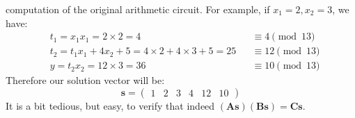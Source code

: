 \begin{example}
	computation of the original arithmetic circuit.
	For example, if \(x_1 = 2, x_2 = 3\), we have:
	\begin{align*}
		 & t_1 = x_1x_1 = 2 \times 2 = 4                              &  & \equiv  4  \pmod{13} \\
		 & t_2 = t_1x_1 + 4x_2 + 5 = 4 \times 2 + 4 \times 3 + 5 = 25 &  & \equiv 12 \pmod{13}  \\
		 & y = t_2x_2 = 12 \times 3 = 36                              &  & \equiv 10 \pmod{13}
	\end{align*}
	Therefore our solution vector will be:
	\[\bm{s} = \begin{pmatrix}1 & 2 & 3 & 4 & 12 & 10\end{pmatrix} \]
	It is a bit tedious, but easy, to verify that indeed
	\((\bm{A}\bm{s})(\bm{B}\bm{s}) = \bm{C}\bm{s}\).
\end{example}

